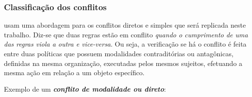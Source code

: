 \documentclass[
	12pt,				%
	openright,			%
	oneside,			%
	a4paper,			%
	english,			%
	french,				%
	spanish,			%
	brazil				%
	]{abntex2}
\begin{document}
%


\subsubsection{Classificação dos conflitos}\label{subsec-classificacao-conflito}
 usam uma abordagem para os conflitos diretos e simples que será replicada neste trabalho. Diz-se que duas regras estão em conflito \textit{quando o cumprimento de uma das regras viola a outra e vice-versa}. Ou seja, a verificação se há o conflito é feita entre duas políticas que possuem modalidades contraditórias ou antagônicas, definidas na mesma organização, executadas pelos mesmos sujeitos, efetuando a mesma ação em relação a um objeto específico.

Exemplo de um \textit{\textbf{conflito de modalidade ou direto}}:
\end{document}
